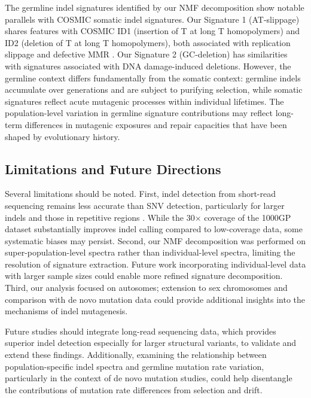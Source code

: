 \documentclass[11pt,a4paper]{article}
\begin{document}
The germline indel signatures identified by our NMF decomposition show notable parallels with COSMIC somatic indel signatures. Our Signature 1 (AT-slippage) shares features with COSMIC ID1 (insertion of T at long T homopolymers) and ID2 (deletion of T at long T homopolymers), both associated with replication slippage and defective MMR \citep{alexandrov2020repertoire}. Our Signature 2 (GC-deletion) has similarities with signatures associated with DNA damage-induced deletions. However, the germline context differs fundamentally from the somatic context: germline indels accumulate over generations and are subject to purifying selection, while somatic signatures reflect acute mutagenic processes within individual lifetimes. The population-level variation in germline signature contributions may reflect long-term differences in mutagenic exposures and repair capacities that have been shaped by evolutionary history.

\subsection{Limitations and Future Directions}

Several limitations should be noted. First, indel detection from short-read sequencing remains less accurate than SNV detection, particularly for larger indels and those in repetitive regions \citep{chaisson2019multi}. While the 30$\times$ coverage of the 1000GP dataset substantially improves indel calling compared to low-coverage data, some systematic biases may persist. Second, our NMF decomposition was performed on super-population-level spectra rather than individual-level spectra, limiting the resolution of signature extraction. Future work incorporating individual-level data with larger sample sizes could enable more refined signature decomposition. Third, our analysis focused on autosomes; extension to sex chromosomes and comparison with de novo mutation data could provide additional insights into the mechanisms of indel mutagenesis.

Future studies should integrate long-read sequencing data, which provides superior indel detection especially for larger structural variants, to validate and extend these findings. Additionally, examining the relationship between population-specific indel spectra and germline mutation rate variation, particularly in the context of de novo mutation studies, could help disentangle the contributions of mutation rate differences from selection and drift.
\end{document}

